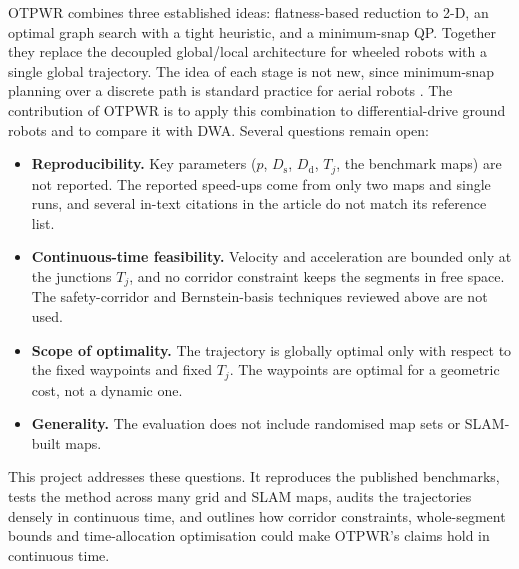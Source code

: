 \documentclass[11pt,a4paper]{article}
\begin{document}
OTPWR \citep{luo2024otpwr} combines three established ideas: flatness-based
reduction to 2-D, an optimal graph search with a tight heuristic, and a
minimum-snap QP. Together they replace the decoupled global/local
architecture for wheeled robots with a single global trajectory. The idea of
each stage is not new, since minimum-snap planning over a discrete path is
standard practice for aerial robots \citep{richter2016polynomial}. The
contribution of OTPWR is to apply this combination to differential-drive
ground robots and to compare it with DWA. Several questions remain open:
\begin{itemize}[nosep]
  \item \textbf{Reproducibility.} Key parameters ($p$, $D_{\mathrm{s}}$,
        $D_{\mathrm{d}}$, $T_j$, the benchmark maps) are not reported. The
        reported speed-ups come from only two maps and single runs, and
        several in-text citations in the article do not match its reference
        list.
  \item \textbf{Continuous-time feasibility.} Velocity and acceleration are
        bounded only at the junctions $T_j$, and no corridor constraint keeps
        the segments in free space. The safety-corridor and Bernstein-basis
        techniques reviewed above are not used.
  \item \textbf{Scope of optimality.} The trajectory is globally optimal
        only with respect to the fixed waypoints and fixed $T_j$. The
        waypoints are optimal for a geometric cost, not a dynamic one.
  \item \textbf{Generality.} The evaluation does not include randomised map
        sets or SLAM-built maps.
\end{itemize}
This project addresses these questions. It reproduces the published
benchmarks, tests the method across many grid and SLAM maps, audits the
trajectories densely in continuous time, and outlines how corridor
constraints, whole-segment bounds and time-allocation optimisation could make
OTPWR's claims hold in continuous time.



\end{document}
